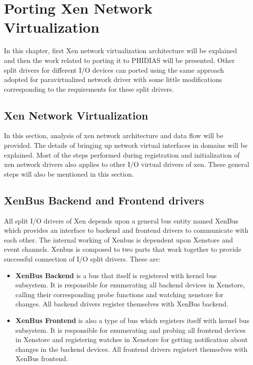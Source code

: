 \chapter{Porting Xen Network Virtualization\label{cha:chapter6}}
In this chapter, first Xen network virtualization architecture will be explained and then the work related to porting it to PHIDIAS will be presented. Other split drivers for different I/O devices can ported using the same approach adopted for paravirtualized network driver with some little modifications corresponding to the requirements for these split drivers.

\section{Xen Network Virtualization \label{sec:xennetwork}}
In this section, analysis of xen network architecture and data flow will be provided. The details of bringing up network virtual interfaces in domains will be explained. Most of the steps performed during registration and initialization of xen network drivers also applies to other I/O virtual drivers of xen. These general steps will also be mentioned in this section.

\section{XenBus Backend and Frontend drivers \label{sec:xenbus}}
All split I/O drivers of Xen depends upon a general bus entity named XenBus which provides an interface to backend and frontend drivers to communicate with each other. The internal working of Xenbus is dependent upon Xenstore and event channels. Xenbus is composed to two parts that work together to provide successful connection of I/O split drivers. These are:
\begin{itemize}
	\item \textbf{XenBus Backend} is a bus that itself is registered with kernel bus subsystem. It is responsible for enumerating all backend devices in Xenstore, calling their corresponding probe functions and watching xenstore for changes. All backend drivers register themselves with XenBus backend.
	\item \textbf{XenBus Frontend} is also a type of bus which registers itself with kernel bus subsystem. It is responsible for enumerating and probing all frontend devices in Xenstore and registering watches in Xenstore for getting notification about changes in the backend devices. All frontend drivers registert themselves with XenBus frontend.
\end{itemize}